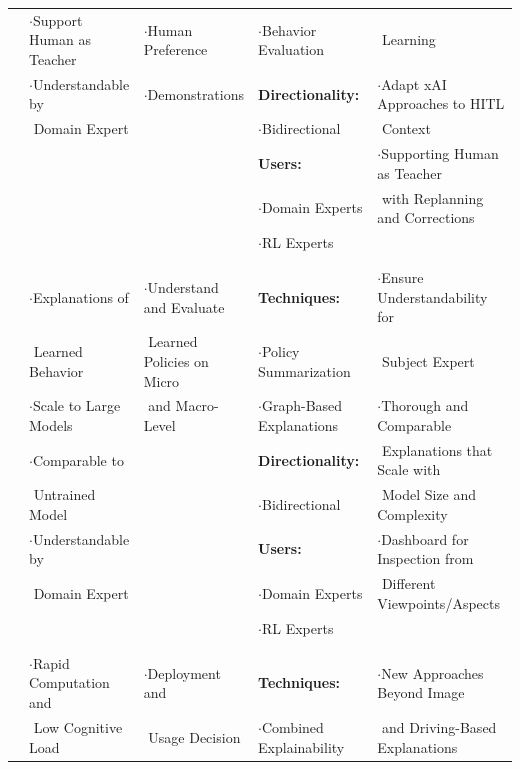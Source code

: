 \documentclass[twoside,11pt]{article}
\begin{document}
\begin{table}[!htbp]
{\begin{tabular}{|c||l|l|l|l|}
			& $\cdot$Support Human as Teacher &	 $\cdot$Human Preference 	&	 $\cdot$Behavior Evaluation 	&	$ $ Learning	\\
			& $\cdot$Understandable by&	 $\cdot$Demonstrations 	&	\textbf{Directionality:}   	&	$\cdot$Adapt xAI Approaches to HITL\\
			& $ $ Domain Expert & 	&	 $\cdot$Bidirectional 	&$ $ Context	\\
			&   & 	&	 \textbf{Users:}	&	$\cdot$Supporting Human as Teacher 	\\
			&   & 	&	 $\cdot$Domain Experts	&	$ $ with Replanning and Corrections	\\
			&   & 	&	 $\cdot$RL Experts	&	\\
			&  &  & & \\
			\cline{1-5}
			\multirow{10}{*}{\rotatebox{90}{\hspace{0em}\textsc{Evaluation}}}
			&  &  & & \\
			& $\cdot$Explanations of  & $\cdot$Understand and Evaluate	&	 \textbf{Techniques:}	& $\cdot$Ensure Understandability for	\\
			&  $ $ Learned Behavior & $ $ Learned Policies on Micro	&	 $\cdot$Policy Summarization	&$ $ Subject Expert	\\
			& $\cdot$Scale to Large Models  & $ $ and Macro-Level	&	 $\cdot$Graph-Based Explanations	&	$\cdot$Thorough and Comparable \\
			& $\cdot$Comparable to  & 	&	 \textbf{Directionality:}	& $ $ Explanations that Scale with	\\
			& $ $ Untrained Model  & 	&	 $\cdot$Bidirectional	& $ $ Model Size and Complexity	\\
			& $\cdot$Understandable by  & 	&	 \textbf{Users:}	& $\cdot$Dashboard for Inspection from 	\\
			&  $ $  Domain Expert& 	&	 $\cdot$Domain Experts	&$ $ Different Viewpoints/Aspects	\\
			&  $ $   & 	&	 $\cdot$RL Experts	& 	\\
			&  &  & & \\
			\cline{1-5}
			\multirow{10}{*}{\rotatebox{90}{\hspace{0em}\textsc{Deployment}}}
			&  &  & & \\
			&  $\cdot$Rapid Computation and& $\cdot$Deployment and	&\textbf{Techniques:}	&	$\cdot$New Approaches Beyond Image\\
			&  $ $  Low Cognitive Load& $ $ Usage Decision	&	 $\cdot$Combined Explainability	&$ $ and Driving-Based Explanations	\\

\end{tabular}}
\end{table}
\end{document}

